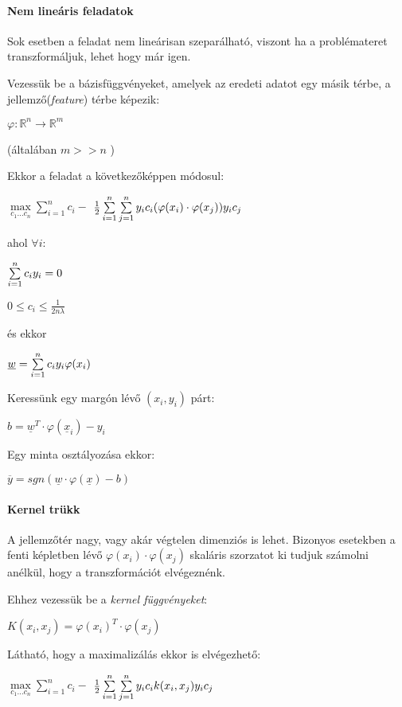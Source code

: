 \paragraph{Nem lineáris feladatok} 


Sok esetben a feladat nem lineárisan szeparálható, viszont ha a problémateret
transzformáljuk, lehet hogy már igen. 

Vezessük be a bázisfüggvényeket, amelyek az eredeti adatot egy másik térbe,
a jellemző(\textit{feature}) térbe képezik:


$ \varphi : \mathbb{R}^n \rightarrow \mathbb{R}^m $

(általában $ m >> n $ )


\noindent
Ekkor a feladat a következőképpen módosul:

$ \max\limits_{c_1 \dots c_n} \sum\limits_{i=1}^{n}c_i -  $
$ \frac{1}{2}\sum\limits_{{i}=1}^{n}\sum\limits_{{j}=1}^{n} y_i c_i (\varphi(x_i) \cdot \varphi(x_j)) y_i c_j $

\noindent
ahol $ \forall i: $

$  \sum\limits_{{i}=1}^{n} c_i y_i = 0 $

$ 0 \leq c_i \leq \frac{1}{2n\lambda} $

\noindent
és ekkor

$ \underline{w} = \sum\limits_{{i}=1}^{n} c_i y_i \varphi(x_i) $

\noindent
Keressünk egy margón lévő $ (x_i, y_i) $ párt:

$ b = \underline{w}^T \cdot \varphi(\underline{x}_i)  - y_i$


\noindent
Egy minta osztályozása ekkor:

$ \overline{y} = sgn(\underline{w} \cdot \varphi(\underline{x}) - b) $


\paragraph{Kernel trükk} 

A jellemzőtér nagy, vagy akár végtelen dimenziós is lehet. Bizonyos esetekben a fenti képletben lévő
$ \varphi(x_i) \cdot \varphi(x_j) $ skaláris szorzatot ki tudjuk számolni anélkül, hogy a transzformációt 
elvégeznénk.



\noindent
Ehhez vezessük be a \textit{kernel függvényeket}:

$ K(x_i, x_j) = \varphi(x_i)^T \cdot \varphi(x_j) $

\noindent
Látható, hogy a maximalizálás ekkor is elvégezhető:


$ \max\limits_{c_1 \dots c_n} \sum\limits_{i=1}^{n}c_i -  $
$ \frac{1}{2}\sum\limits_{{i}=1}^{n}\sum\limits_{{j}=1}^{n} y_i c_i k(x_i, x_j) y_i c_j $


